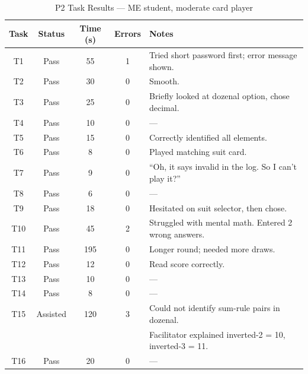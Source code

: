 \documentclass[12pt, titlepage]{article}
\begin{document}
\begin{table}[H]
\centering
\caption{P2 Task Results --- ME student, moderate card player}
\label{tab:p2-raw}
\begin{tabular}{c c c c l}
\toprule
\textbf{Task} & \textbf{Status} & \textbf{Time (s)} & \textbf{Errors} & \textbf{Notes} \\
\midrule
T1  & Pass   & 55  & 1 & Tried short password first; error message shown. \\
T2  & Pass   & 30  & 0 & Smooth. \\
T3  & Pass   & 25  & 0 & Briefly looked at dozenal option, chose decimal. \\
T4  & Pass   & 10  & 0 & --- \\
T5  & Pass   & 15  & 0 & Correctly identified all elements. \\
T6  & Pass   & 8   & 0 & Played matching suit card. \\
T7  & Pass   & 9   & 0 & ``Oh, it says invalid in the log. So I can't play it?'' \\
T8  & Pass   & 6   & 0 & --- \\
T9  & Pass   & 18  & 0 & Hesitated on suit selector, then chose. \\
T10 & Pass   & 45  & 2 & Struggled with mental math. Entered 2 wrong answers. \\
T11 & Pass   & 195 & 0 & Longer round; needed more draws. \\
T12 & Pass   & 12  & 0 & Read score correctly. \\
T13 & Pass   & 10  & 0 & --- \\
T14 & Pass   & 8   & 0 & --- \\
T15 & Assisted & 120 & 3 & Could not identify sum-rule pairs in dozenal. \\
     &          &     &   & Facilitator explained inverted-2 = 10, inverted-3 = 11. \\
T16 & Pass   & 20  & 0 & --- \\
\bottomrule
\end{tabular}
\end{table}
\end{document}
